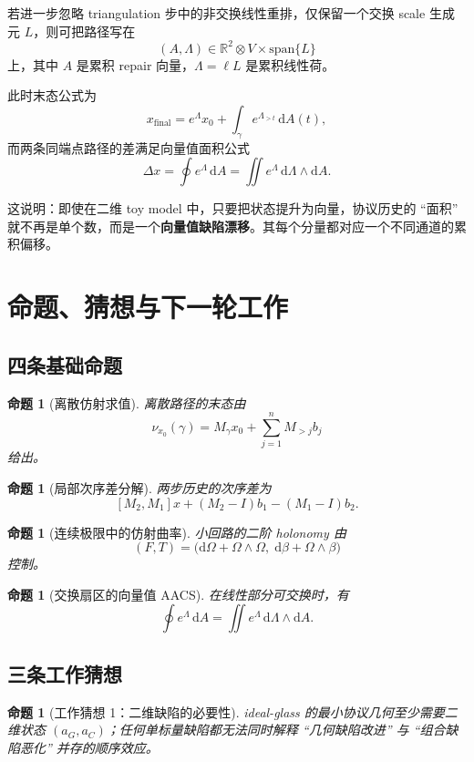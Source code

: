 \documentclass[11pt,a4paper]{ctexart}
\newtheorem{proposition}[definition]{命题}
\theoremstyle{remark}
\newcommand{\R}{\mathbb{R}}
\newcommand{\dd}{\mathrm{d}}
\begin{document}
若进一步忽略 triangulation 步中的非交换线性重排，仅保留一个交换 scale 生成元 $L$，则可把路径写在
\[
(A,\Lambda)\in \R^2\otimes V \times \mathrm{span}\{L\}
\]
上，其中 $A$ 是累积 repair 向量，$\Lambda=\ell L$ 是累积线性荷。

此时末态公式为
\[
x_{\mathrm{final}}=e^{\Lambda}x_0+\int_\gamma e^{\Lambda_{>t}}\,\dd A(t),
\]
而两条同端点路径的差满足向量值面积公式
\[
\Delta x
=
\oint e^{\Lambda}\,\dd A
=
\iint e^{\Lambda}\,\dd\Lambda\wedge\dd A.
\]

这说明：即使在二维 toy model 中，只要把状态提升为向量，协议历史的 ``面积'' 就不再是单个数，而是一个\textbf{向量值缺陷漂移}。其每个分量都对应一个不同通道的累积偏移。

\section{命题、猜想与下一轮工作}

\subsection{四条基础命题}

\begin{proposition}[离散仿射求值]
离散路径的末态由
\[
\nu_{x_0}(\gamma)=M_\gamma x_0+\sum_{j=1}^n M_{>j}b_j
\]
给出。
\end{proposition}

\begin{proposition}[局部次序差分解]
两步历史的次序差为
\[
[M_2,M_1]x+(M_2-I)b_1-(M_1-I)b_2.
\]
\end{proposition}

\begin{proposition}[连续极限中的仿射曲率]
小回路的二阶 holonomy 由
\[
(F,T)=\bigl(\dd\Omega+\Omega\wedge\Omega,\;\dd\beta+\Omega\wedge\beta\bigr)
\]
控制。
\end{proposition}

\begin{proposition}[交换扇区的向量值 AACS]
在线性部分可交换时，有
\[
\oint e^{\Lambda}\,\dd A
=
\iint e^{\Lambda}\,\dd\Lambda\wedge\dd A.
\]
\end{proposition}

\subsection{三条工作猜想}

\begin{proposition}[工作猜想 1：二维缺陷的必要性]
ideal-glass 的最小协议几何至少需要二维状态 $(a_G,a_C)$；任何单标量缺陷都无法同时解释 ``几何缺陷改进'' 与 ``组合缺陷恶化'' 并存的顺序效应。
\end{proposition}
\end{document}
